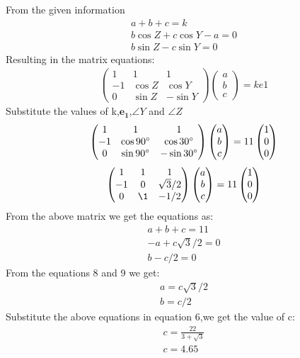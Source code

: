 \documentclass{article}
\newcommand{\myvec}[1]{\ensuremath{\begin{pmatrix}#1\end{pmatrix}}}
\let\vec\mathbf
\begin{document}
 From the given information\\
 \begin{align}
     a+b+c=k\\
     b\cos{Z}+c\cos{Y}-a=0\\
     b\sin{Z}-c\sin{Y}=0
 \end{align}
 Resulting in the matrix equations:\\
 \begin{align}
     \myvec{1 & 1 & 1\\-1 & \cos{Z} & \cos{Y}\\0 & \sin{Z} & -\sin{Y}}\myvec{a\\b\\c}=ke1
 \end{align}
  Substitute the values of k,$\vec{e_1}$,$\angle{Y}$ and $\angle{Z}$\\
  \begin{align}
       \myvec{1 & 1 & 1\\-1 & \cos{90\degree} & \cos{30\degree}\\0 & \sin{90\degree} & -\sin{30\degree}}\myvec{a\\b\\c}= 11\myvec{1 \\ 0 \\ 0 }
  \end{align}
  \begin{align}
      \myvec{1 & 1 & 1\\-1 & 0 & \sqrt{3}/2\\0 & \1 & -1/2}\myvec{a\\b\\c}= 11\myvec{1 \\ 0 \\ 0 }
  \end{align}
  From the above matrix we get the equations as:\\
  \begin{align}
      a+b+c=11\\
      -a+c\sqrt{3}/2=0\\
      b-c/2=0
  \end{align}
  From the equations 8 and 9 we get:\\
  \begin{align}
      a=c\sqrt{3}/2\\
      b=c/2
  \end{align}
  Substitute the above equations in equation 6,we get the value of c:
  \begin{align}
      c=\frac{22}{3+\sqrt{3}}\\
      c=4.65
  \end{align}
\end{document}
